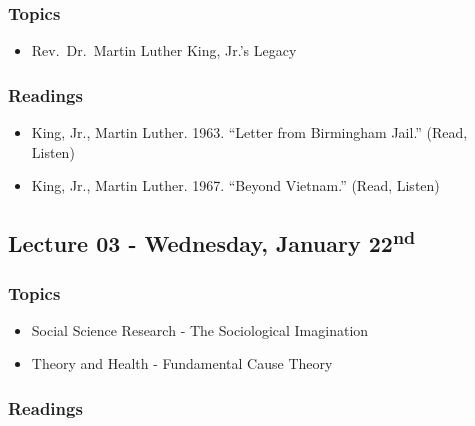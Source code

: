 \documentclass[]{book}
\providecommand{\tightlist}{%
  \setlength{\itemsep}{0pt}\setlength{\parskip}{0pt}}
\begin{document}
\hypertarget{topics-2}{%
\subsubsection*{Topics}\label{topics-2}}

\begin{itemize}
\tightlist
\item
  Rev.~Dr.~Martin Luther King, Jr.'s Legacy
\end{itemize}

\hypertarget{readings-2}{%
\subsubsection*{Readings}\label{readings-2}}

\begin{itemize}
\tightlist
\item
  King, Jr., Martin Luther. 1963. ``Letter from Birmingham Jail.'' (Read, Listen)
\item
  King, Jr., Martin Luther. 1967. ``Beyond Vietnam.'' (Read, Listen)
\end{itemize}

\hypertarget{lecture-03---wednesday-january-22nd}{%
\subsection*{\texorpdfstring{Lecture 03 - Wednesday, January 22\textsuperscript{nd}}{Lecture 03 - Wednesday, January 22nd}}\label{lecture-03---wednesday-january-22nd}}

\hypertarget{topics-3}{%
\subsubsection*{Topics}\label{topics-3}}

\begin{itemize}
\tightlist
\item
  Social Science Research - The Sociological Imagination
\item
  Theory and Health - Fundamental Cause Theory
\end{itemize}

\hypertarget{readings-3}{%
\subsubsection*{Readings}\label{readings-3}}
\end{document}
